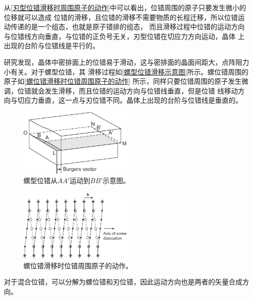                 从\autoref{刃型位错滑移时周围原子的动作}中可以看出，位错周围的原子只要发生微小的位移就可以造成
                位错的滑移，且位错的滑移不需要物质的长程迁移，所以位错运动传递的是一个组态，也就是原子错排的组态，
                而且滑移过程中位错的运动方向与位错线方向垂直，与位错的正负号无关，刃型位错在切应力方向运动，晶体
                上出现的台阶与位错线是平行的。

                研究发现，晶体中密排面上的位错易于滑动，这与密排面的晶面间距大，点阵阻力小有关。对于螺型位错，其
                滑移过程如\autoref{螺型位错滑移示意图}所示。螺位错周围的原子如\autoref{螺位错滑移时位错周围原子的动作}
                所示，同样只要位错周围的原子发生微调，位错就会发生滑移，而且位错的运动方向与位错线垂直，但是位错
                线移动方向与切应力垂直，这一点与刃位错不同。晶体上出现的台阶与位错线是垂直的。
                \begin{figure}[ht]
                    \centering
                    \includegraphics[width=0.5\textwidth]{fig/movement_of_screw_dislocation.jpg}
                    \caption{螺型位错从$AA'$运动到$BB'$示意图。}
                    \label{螺型位错滑移示意图}
                \end{figure}
                \begin{figure}[ht]
                    \centering
                    \includegraphics[width=0.5\textwidth]{fig/Arrangement_of_atoms_of_slip_of_screw_dislocation.jpg}
                    \caption{螺位错滑移时位错周围原子的动作。}
                    \label{螺位错滑移时位错周围原子的动作}
                \end{figure}

                对于混合位错，可以分解为螺位错和刃位错，因此运动方向也是两者的矢量合成方向。

